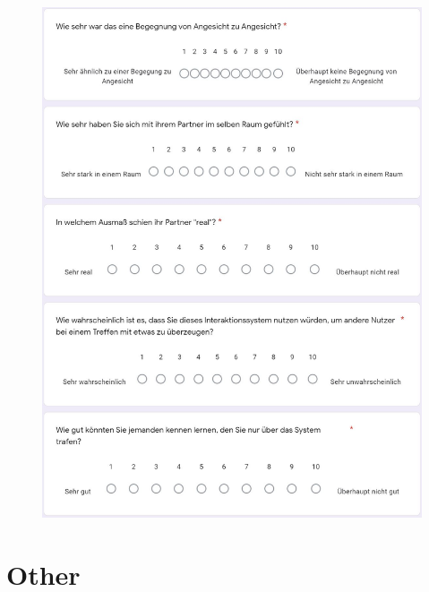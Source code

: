 \documentclass[a4paper,11pt]{article}%
\renewcommand{\\}{\vspace*{0.5\baselineskip} \newline}
\begin{document}
	\begin{figure}[H]
		\begin{footnotesize}
			\includegraphics[width=\textwidth]{Abbildungen/Fragebogen/Post-Questionnaire/PQCP6}
		\end{footnotesize}
	\end{figure}	

\section{Other}	
	
\end{document}
